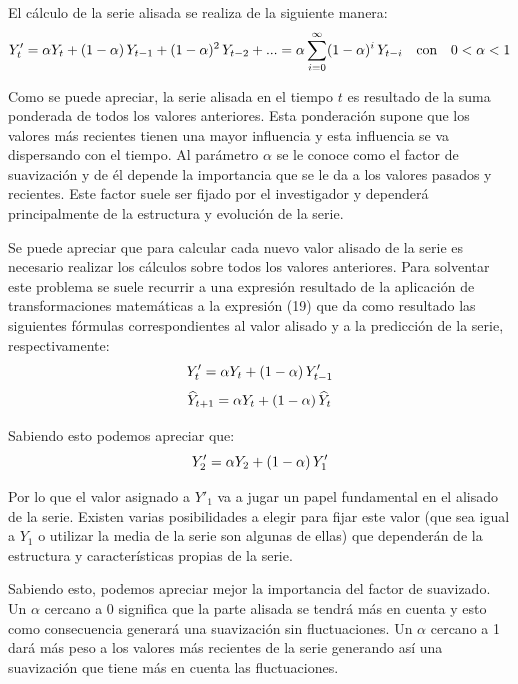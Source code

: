 El cálculo de la serie alisada se realiza de la siguiente manera:
\begin{equation}
   Y'_{t} = \alpha Y_{t} + (1 - \alpha)\thinspace Y_{t-1} + (1 - \alpha)^2 \thinspace Y_{t-2} + ... = \alpha \sum_{i=0}^{\infty} (1 - \alpha)^i \thinspace Y_{t-i} \quad \text{con} \quad 0 < \alpha < 1
\end{equation}

Como se puede apreciar, la serie alisada en el tiempo $t$ es resultado de la suma ponderada de todos los valores anteriores. Esta ponderación supone que los valores más recientes tienen una mayor influencia y esta influencia se va dispersando con el tiempo. Al parámetro $\alpha$ se le conoce como el factor de suavización y de él depende la importancia que se le da a los valores pasados y recientes. Este factor suele ser fijado por el investigador y dependerá principalmente de la estructura y evolución de la serie.

Se puede apreciar que para calcular cada nuevo valor alisado de la serie es necesario realizar los cálculos sobre todos los valores anteriores.  Para solventar este problema se suele recurrir a una expresión resultado de la aplicación de transformaciones matemáticas a la expresión (19) que da como resultado las siguientes fórmulas correspondientes al valor alisado y a la predicción de la serie, respectivamente:
\begin{equation}
   Y'_{t} = \alpha Y_{t} + (1 - \alpha)\thinspace Y'_{t-1}
\end{equation}
\begin{equation}
   \widehat{Y}_{t+1} = \alpha Y_{t} + (1 - \alpha)\thinspace \widehat{Y}_{t}
\end{equation}

Sabiendo esto podemos apreciar que:
\begin{equation}
   Y'_{2} = \alpha Y_{2} + (1 - \alpha)\thinspace Y'_{1}
\end{equation}

Por lo que el valor asignado a $Y'_{1}$ va a jugar un papel fundamental en el alisado de la serie. Existen varias posibilidades a elegir para fijar este valor (que sea igual a $Y_{1}$ o utilizar la media de la serie son algunas de ellas) que dependerán de la estructura y características propias de la serie.

Sabiendo esto, podemos apreciar mejor la importancia del factor de suavizado. Un $\alpha$ cercano a 0 significa que la parte alisada se tendrá más en cuenta y esto como consecuencia generará una suavización sin fluctuaciones. Un $\alpha$ cercano a 1 dará más peso a los valores más recientes de la serie generando así una suavización que tiene más en cuenta las fluctuaciones.

